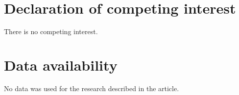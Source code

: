 \documentclass[11pt,reqno]{amsart}
\theoremstyle{definition}
\theoremstyle{remark}
\begin{document}
\section*{Declaration of competing interest}

\noindent
There is no competing interest.


\section*{Data availability}

\noindent
No data was used for the research described in the article.






\end{document}
